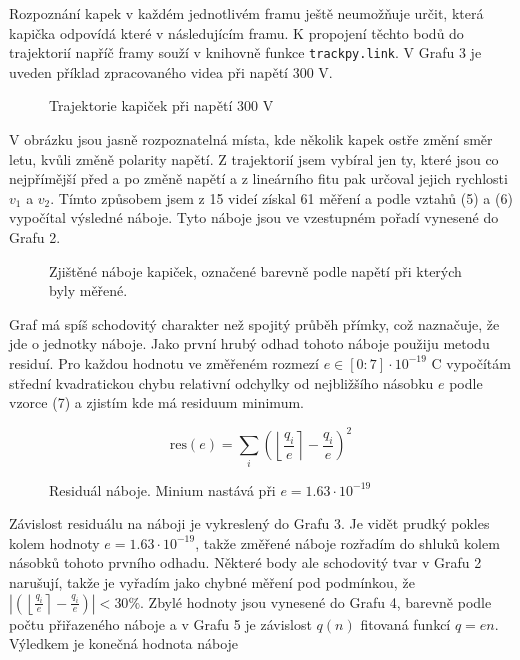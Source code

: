 \documentclass[a4paper,11pt]{article}
\begin{document}
Rozpoznání kapek v každém jednotlivém framu ještě neumožňuje určit, která kapička odpovídá které v následujícím framu. K propojení těchto bodů do trajektorií napříč framy souží v knihovně funkce \texttt{trackpy.link}. V Grafu 3 je uveden příklad zpracovaného videa při napětí 300 V. 

\begin{figure}[htpb]
    \centering
    
    \captionsetup{type=graph}
    \caption{Trajektorie kapiček při napětí 300 V}
\end{figure}

V obrázku jsou jasně rozpoznatelná místa, kde několik kapek ostře změní směr letu, kvůli změně polarity napětí. Z trajektorií jsem vybíral jen ty, které jsou co nejpřímější před a po změně napětí a z lineárního fitu pak určoval jejich rychlosti $ v_1 $ a $ v_2 $. Tímto způsobem jsem z 15 videí získal 61 měření a podle vztahů (5) a (6) vypočítal výsledné náboje. Tyto náboje jsou ve vzestupném pořadí vynesené do Grafu 2.

\begin{figure}[htpb]
    \centering
    
    \captionsetup{type=graph}
    \caption{Zjištěné náboje kapiček, označené barevně podle napětí při kterých byly měřené.}
\end{figure}

Graf má spíš schodovitý charakter než spojitý průběh přímky, což naznačuje, že jde o jednotky náboje. Jako první hrubý odhad tohoto náboje použiju metodu residuí. Pro každou hodnotu ve změřeném rozmezí  $ e \in [0:7] \cdot 10^{-19} $ C vypočítám střední kvadratickou chybu relativní odchylky od nejbližšího násobku $ e $ podle vzorce (7) a zjistím kde má residuum minimum. 

\begin{equation}
\text{res}(e) = \sum_i \left( \left\lfloor \frac{q_i}{e} \right\rceil - \frac{q_i}{e}  \right)  ^2
\end{equation}

\newpage

\begin{figure}[htpb]
    \centering
    
    \captionsetup{type=graph}
    \caption{ Residuál náboje. Minium nastává při $ e = 1.63 \cdot 10^{-19} $   }
\end{figure}


Závislost residuálu na náboji je vykreslený do Grafu 3. Je vidět prudký pokles kolem hodnoty $ e = 1.63 \cdot 10^{-19} $, takže změřené náboje rozřadím do shluků kolem násobků tohoto prvního odhadu. Některé body ale schodovitý tvar v Grafu 2 narušují, takže je vyřadím jako chybné měření pod podmínkou, že $ | \left( \left\lfloor \frac{q_i}{e} \right\rceil - \frac{q_i}{e}  \right) | < 30 \% $. Zbylé hodnoty jsou vynesené do Grafu 4, barevně podle počtu přiřazeného náboje a v Grafu 5 je závislost $ q(n) $  fitovaná funkcí $ q = en $. Výledkem je konečná hodnota náboje 
\end{document}
